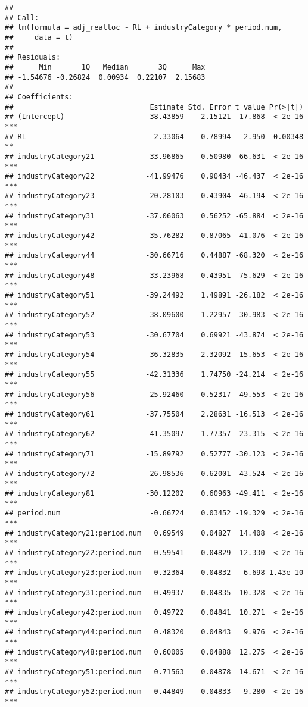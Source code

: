 \documentclass[
]{article}
\begin{document}
\begin{verbatim}
## 
## Call:
## lm(formula = adj_realloc ~ RL + industryCategory * period.num, 
##     data = t)
## 
## Residuals:
##      Min       1Q   Median       3Q      Max 
## -1.54676 -0.26824  0.00934  0.22107  2.15683 
## 
## Coefficients:
##                                Estimate Std. Error t value Pr(>|t|)    
## (Intercept)                    38.43859    2.15121  17.868  < 2e-16 ***
## RL                              2.33064    0.78994   2.950  0.00348 ** 
## industryCategory21            -33.96865    0.50980 -66.631  < 2e-16 ***
## industryCategory22            -41.99476    0.90434 -46.437  < 2e-16 ***
## industryCategory23            -20.28103    0.43904 -46.194  < 2e-16 ***
## industryCategory31            -37.06063    0.56252 -65.884  < 2e-16 ***
## industryCategory42            -35.76282    0.87065 -41.076  < 2e-16 ***
## industryCategory44            -30.66716    0.44887 -68.320  < 2e-16 ***
## industryCategory48            -33.23968    0.43951 -75.629  < 2e-16 ***
## industryCategory51            -39.24492    1.49891 -26.182  < 2e-16 ***
## industryCategory52            -38.09600    1.22957 -30.983  < 2e-16 ***
## industryCategory53            -30.67704    0.69921 -43.874  < 2e-16 ***
## industryCategory54            -36.32835    2.32092 -15.653  < 2e-16 ***
## industryCategory55            -42.31336    1.74750 -24.214  < 2e-16 ***
## industryCategory56            -25.92460    0.52317 -49.553  < 2e-16 ***
## industryCategory61            -37.75504    2.28631 -16.513  < 2e-16 ***
## industryCategory62            -41.35097    1.77357 -23.315  < 2e-16 ***
## industryCategory71            -15.89792    0.52777 -30.123  < 2e-16 ***
## industryCategory72            -26.98536    0.62001 -43.524  < 2e-16 ***
## industryCategory81            -30.12202    0.60963 -49.411  < 2e-16 ***
## period.num                     -0.66724    0.03452 -19.329  < 2e-16 ***
## industryCategory21:period.num   0.69549    0.04827  14.408  < 2e-16 ***
## industryCategory22:period.num   0.59541    0.04829  12.330  < 2e-16 ***
## industryCategory23:period.num   0.32364    0.04832   6.698 1.43e-10 ***
## industryCategory31:period.num   0.49937    0.04835  10.328  < 2e-16 ***
## industryCategory42:period.num   0.49722    0.04841  10.271  < 2e-16 ***
## industryCategory44:period.num   0.48320    0.04843   9.976  < 2e-16 ***
## industryCategory48:period.num   0.60005    0.04888  12.275  < 2e-16 ***
## industryCategory51:period.num   0.71563    0.04878  14.671  < 2e-16 ***
## industryCategory52:period.num   0.44849    0.04833   9.280  < 2e-16 ***

\end{verbatim}
\end{document}
